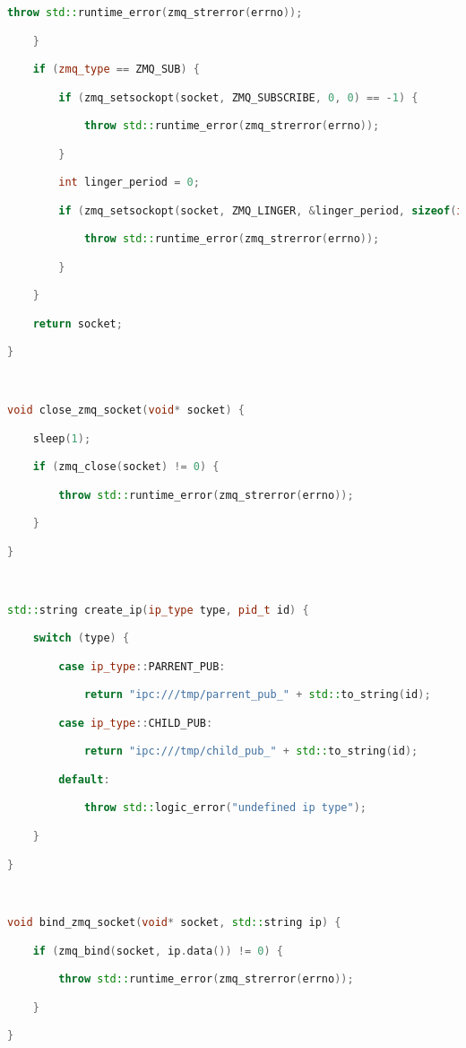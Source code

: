 \begin{lstlisting}[language=C++]
        throw std::runtime_error(zmq_strerror(errno));

    }

    if (zmq_type == ZMQ_SUB) {

        if (zmq_setsockopt(socket, ZMQ_SUBSCRIBE, 0, 0) == -1) {

            throw std::runtime_error(zmq_strerror(errno));

        }

        int linger_period = 0;

        if (zmq_setsockopt(socket, ZMQ_LINGER, &linger_period, sizeof(int)) == -1) {

            throw std::runtime_error(zmq_strerror(errno));

        }

    }

    return socket;

}



void close_zmq_socket(void* socket) {

    sleep(1);

    if (zmq_close(socket) != 0) {

        throw std::runtime_error(zmq_strerror(errno));

    }

}



std::string create_ip(ip_type type, pid_t id) {

    switch (type) {

        case ip_type::PARRENT_PUB:

            return "ipc:///tmp/parrent_pub_" + std::to_string(id);

        case ip_type::CHILD_PUB:

            return "ipc:///tmp/child_pub_" + std::to_string(id);

        default:

            throw std::logic_error("undefined ip type");

    }

}



void bind_zmq_socket(void* socket, std::string ip) {

    if (zmq_bind(socket, ip.data()) != 0) {

        throw std::runtime_error(zmq_strerror(errno));

    }

}




\end{lstlisting}
